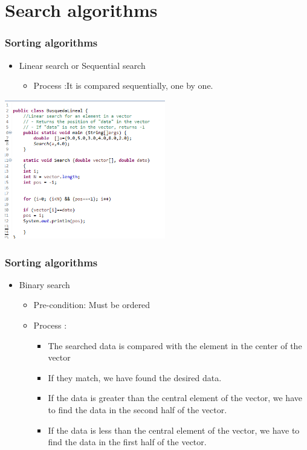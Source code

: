 \documentclass[11pt]{beamer}
\begin{document}
\section{Search algorithms}
\begin{frame}
\frametitle{Sorting algorithms}
\begin{itemize}
\item Linear search or Sequential search
\begin{itemize}
\item Process :It is compared sequentially, one by one.
\end{itemize}
\end{itemize}
\begin{center}
\includegraphics[width=7.0cm]{img/lineal (2).png}
\end{center}
\end{frame}

\begin{frame}
\frametitle{Sorting algorithms}
\begin{itemize}
\item Binary search
\begin{itemize}
\item Pre-condition: Must be ordered
\item Process :
\begin{itemize}
\item The searched data is compared with the element in the center of the vector
\item If they match, we have found the desired data.
\item If the data is greater than the central element of the vector, we have to find the data in the second half of the vector.
\item If the data is less than the central element of the vector, we have to find the data in the first half of the vector.
\end{itemize}
\end{itemize}
\end{itemize}
\end{frame}
\end{document}
